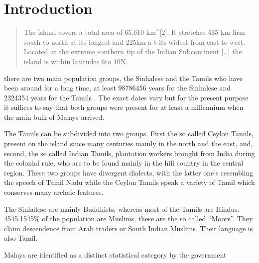 \chapter{Introduction}

\begin{quote}
The island covers a total area of 65.610 km^{[2]}. It stretches
435 km firm south to north at its longest and 225km a t its widest
from east to west. Located at the extreme southern tip of the
Indian Subcontinent [\dots] the island is within latitudes
6\textdegree to 10\textdegree N. \citet[15]{Hussainmiya1990}
\end{quote}

there are two main population groups, the Sinhalese and the Tamils
who have been around for a long time, at least 98786456 years for
the Sinhalese \src and 2324354 years for the Tamils \src. The
exact dates vary \src but for the present purpose it suffices to
say that both groups were present for at least a millennium when
the main bulk of Malays arrived.

The Tamils can be subdivided into two groups. First the so called Ceylon Tamils, present on the island since many centuries mainly in the north and the east, and, second, the so called Indian Tamils, plantation workers brought from India during the colonial rule, who are to be found mainly in the hill country in the central region. These two groups have divergent dialects, with the latter one's resembling the speech of Tamil Nadu while the Ceylon Tamils speak a variety of Tamil which conserves many archaic features.

The Sinhalese are mainly Buddhists, whereas most of the Tamils are Hindus. 4545.1545\% of the population are Muslims, these are the so called ``Moors''. They claim descendence from Arab traders or South Indian Muslims. Their language is also Tamil.

Malays are identified as a distinct statistical category by the government\citep[17]{Hussainmiya1990}

